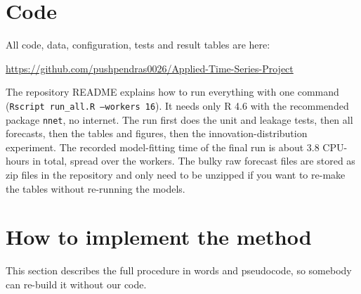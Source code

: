 \documentclass{article}
\begin{document}

\printAffiliationsAndNotice{}

\section{Code}

All code, data, configuration, tests and result tables are here:

\begin{center}
\url{https://github.com/pushpendras0026/Applied-Time-Series-Project}
\end{center}

The repository README explains how to run everything with one command (\texttt{Rscript run\_all.R --workers 16}). It needs only R 4.6 with the recommended package \texttt{nnet}, no internet. The run first does the unit and leakage tests, then all forecasts, then the tables and figures, then the innovation-distribution experiment. The recorded model-fitting time of the final run is about 3.8 CPU-hours in total, spread over the workers. The bulky raw forecast files are stored as zip files in the repository and only need to be unzipped if you want to re-make the tables without re-running the models.

\section{How to implement the method}

This section describes the full procedure in words and pseudocode, so somebody can re-build it without our code.
\end{document}
